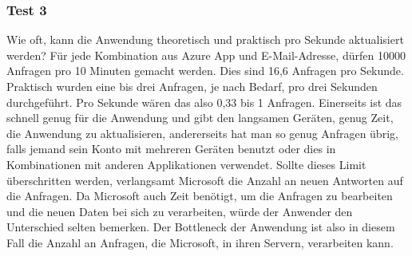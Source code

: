 \subsubsection{Test 3}\label{subsubsec:test-3}
\newline
\newline
{}
Wie oft, kann die Anwendung theoretisch und praktisch pro Sekunde aktualisiert werden?
Für jede Kombination aus Azure App und E-Mail-Adresse, dürfen 10000 Anfragen pro 10 Minuten gemacht werden.
Dies sind 16,6 Anfragen pro Sekunde.
Praktisch wurden eine bis drei Anfragen, je nach Bedarf, pro drei Sekunden durchgeführt.
Pro Sekunde wären das also 0,33 bis 1 Anfragen.
Einerseits ist das schnell genug für die Anwendung und gibt den langsamen Geräten, genug Zeit, die Anwendung zu aktualisieren, andererseits hat man so genug Anfragen übrig, falls jemand sein Konto mit mehreren Geräten benutzt oder dies in Kombinationen mit anderen Applikationen verwendet.
Sollte dieses Limit überschritten werden, verlangsamt Microsoft die Anzahl an neuen Antworten auf die Anfragen.
Da Microsoft auch Zeit benötigt, um die Anfragen zu bearbeiten und die neuen Daten bei sich zu verarbeiten, würde der Anwender den Unterschied selten bemerken.
Der \gls{Bottleneck} der Anwendung ist also in diesem Fall die Anzahl an Anfragen, die Microsoft, in ihren Servern, verarbeiten kann.
\newline
\newline
